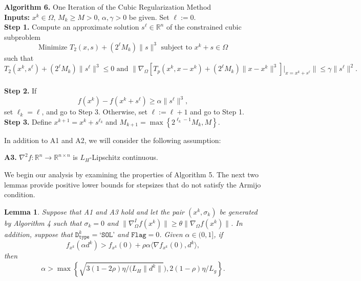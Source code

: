 \documentclass[11pt]{article}
\newtheorem{lemma}[theorem]{Lemma}
\begin{document}
\begin{mdframed}
\noindent\textbf{Algorithm 6.} One Iteration of the Cubic Regularization Method \cite{BM}
\\[0.2cm]
\noindent\textbf{Inputs:} $x^{k}\in\Omega$, $M_{k}\geq M>0$, $\alpha,\gamma>0$ be given. Set $\ell:=0$.
\\[0.2cm]
\noindent\textbf{Step 1.} Compute an approximate solution $s^{\ell}\in\mathbb{R}^{n}$ of the constrained cubic subproblem 
\[\text{Minimize $T_{2}(x,s) + (2^{\ell}M_{k}) \|s\|^{3}$ subject to $x^{k}+s\in\Omega$}
\]
such that 
\[T_{2}(x^{k},s^{\ell})+(2^{\ell}M_{k})\|s^{\ell}\|^{3}\leq 0\,\,\text{and}\,\,\|\nabla_{\Omega}[T_{p}(x^{k},x-x^{k})+(2^{\ell}M_{k})\|x-x^{k}\|^{3}]|_{x=x^{k}+s^{\ell}}\|\leq\gamma\|s^{\ell}\|^{2}.
\]
\\[0.2cm]
\noindent\textbf{Step 2.} If 
\begin{equation} \label{eq:gg_extra1}
f(x^{k})-f(x^{k}+s^{\ell})\geq\alpha\|s^{\ell}\|^{3},
\end{equation}
set $\ell_{k}=\ell$, and go to Step 3. Otherwise, set $\ell:=\ell+1$ and go to Step 1. 
\\[0.2cm]
\noindent\textbf{Step 3.} Define $x^{k+1}=x^{k}+s^{\ell_{k}}$ and $M_{k+1}=\max\left\{2^{\ell_{k}-1}M_{k},M\right\}$.
\end{mdframed}

\noindent In addition to A1 and A2, we will consider the following assumption:
\vspace{0.1cm}
\begin{mdframed}
\noindent\textbf{A3.} $\nabla^{2}f:\mathbb{R}^{n}\to\mathbb{R}^{n\times n}$ is $L_{H}$-Lipschitz continuous.
\end{mdframed}
\vspace{0.1cm}

We begin our analysis by examining the properties of Algorithm 5. The next two lemmas provide positive lower bounds for stepsizes that do not satisfy the Armijo condition.

\begin{lemma}
Suppose that A1 and A3 hold and let the pair $(x^{k},\sigma_{k})$ be generated by Algorithm 4 such that $\sigma_{k}=0$ and $\|\nabla_{\Omega}^{I}f(x^{k})\|\geq\theta\|\nabla_{\Omega}f(x^{k})\|$. In addition, suppose that $\texttt{D}_{\texttt{type}}^{k}=\texttt{`SOL'}$ and $\texttt{Flag}=0$. Given $\alpha\in (0,1]$, if 
\begin{equation}
f_{x^{k}}(\alpha d^{k})>f_{x^{k}}(0)+\rho\alpha\langle\nabla f_{x^{k}}(0),d^{k}\rangle,
\label{eq:final1}
\end{equation}
then
\small
\begin{equation}
\alpha>\max\left\{\sqrt{3(1-2\rho)\eta/(L_{H}\|d^{k}\|}),2(1-\rho)\eta/L_{g}\right\}.
\label{eq:final2}
\end{equation}
\normalsize
\label{lem:2.2final}
\end{lemma}
\end{document}
